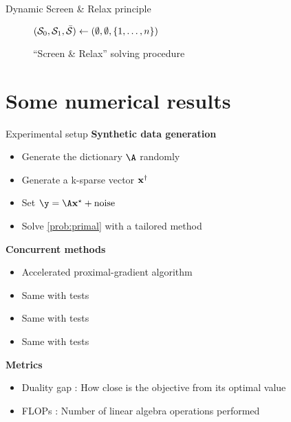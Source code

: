 \documentclass[10pt]{beamer}
\begin{document}
\begin{frame}{Dynamic Screen \& Relax principle}
  \begin{figure}
    \centering
    \begin{minipage}{0.8\linewidth}
      \begin{algorithm}[H]
        \small
        \DontPrintSemicolon
        
        \BlankLine
        \((\mathcal{S}_0,\mathcal{S}_1,\bar{\mathcal{S}}) \leftarrow (\emptyset,\emptyset,\{1,\dots,n\})\)\;
        \BlankLine

        \caption{``Screen \& Relax'' solving procedure}
      \end{algorithm}
    \end{minipage}
  \end{figure}
\end{frame}

\section{Some numerical results}

\begin{frame}{Experimental setup}
  \textbf{Synthetic data generation}
  \begin{itemize}
    \item Generate the dictionary $\dic$ randomly
    \item Generate a k-sparse vector $\mathbf{x}^{\dagger}$
    \item Set $\obs = \dic\opt{\pv} + \text{noise}$
    \item Solve \eqref{prob:primal} with a tailored method
  \end{itemize}
  \pause
  \textbf{Concurrent methods}
  \begin{itemize}
    \item Accelerated proximal-gradient algorithm 
    \item Same with  tests
    \item Same with  tests
    \item Same with  tests 
  \end{itemize}
  \pause
  \textbf{Metrics}
  \begin{itemize}
    \item Duality gap : How close is the objective from its optimal value
    \item FLOPs : Number of linear algebra operations performed
  \end{itemize}
\end{frame}
\end{document}

